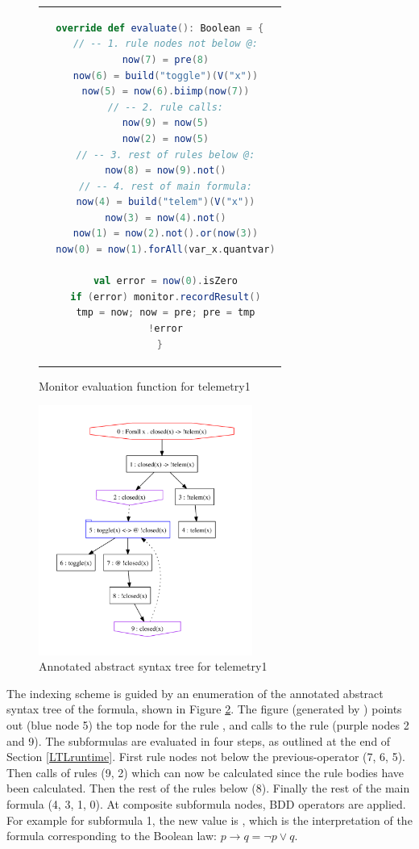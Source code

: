 \begin{figure}
\begin{center}
\begin{tabular}{c}
\begin{lstlisting}[language=scala,basicstyle=\small\sffamily]
override def evaluate(): Boolean = {
  // -- 1. rule nodes not below @:
  now(7) = pre(8)
  now(6) = build("toggle")(V("x"))
  now(5) = now(6).biimp(now(7))
  // -- 2. rule calls:
  now(9) = now(5)
  now(2) = now(5)
  // -- 3. rest of rules below @:
  now(8) = now(9).not()
  // -- 4. rest of main formula:
  now(4) = build("telem")(V("x"))
  now(3) = now(4).not()
  now(1) = now(2).not().or(now(3))
  now(0) = now(1).forAll(var_x.quantvar)

  val error = now(0).isZero
  if (error) monitor.recordResult()
  tmp = now; now = pre; pre = tmp
  !error
}
\end{lstlisting}
\end{tabular}
\end{center}
\caption{Monitor evaluation function for telemetry1}
\label{fig:monitor}
\end{figure}

\begin{figure}
\centering
\includegraphics[width=7cm]{figures/ast.pdf}
\caption{Annotated abstract syntax tree for telemetry1}
\label{fig:ast}
\end{figure}

The indexing scheme is guided by an enumeration of the annotated abstract syntax tree of the formula, shown in Figure \ref{fig:ast}. The figure (generated by \dejavu) points out (blue node 5) the top node for the rule , and calls to the rule (purple nodes 2 and 9).
The subformulas are evaluated in four steps, as outlined at the end of Section \ref{LTLruntime}. First rule nodes not below the previous-operator  (7, 6, 5). Then calls of rules (9, 2)
which can now be calculated since the rule bodies have been calculated. Then the rest of the rules below   (8). Finally the rest of the main formula (4, 3, 1, 0). At composite subformula nodes, BDD operators are applied. For example for subformula  1, the new  value is , 
which is the interpretation of the formula 
 corresponding to the Boolean law:
$p \rightarrow q = \neg p \vee q$.

